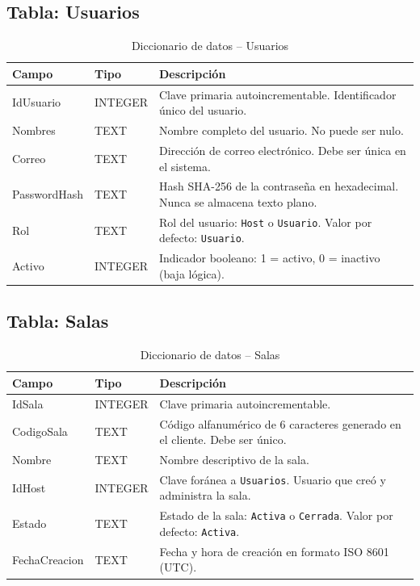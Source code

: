 \documentclass[12pt,a4paper]{article}
\begin{document}
\subsection*{Tabla: Usuarios}
\begin{table}[H]
\centering
\small
\begin{tabular}{p{3cm}p{2cm}p{8.5cm}}
\toprule
\textbf{Campo} & \textbf{Tipo} & \textbf{Descripci\'on} \\
\midrule
IdUsuario & INTEGER & Clave primaria autoincrementable. Identificador \'unico del usuario. \\
Nombres & TEXT & Nombre completo del usuario. No puede ser nulo. \\
Correo & TEXT & Direcci\'on de correo electr\'onico. Debe ser \'unica en el sistema. \\
PasswordHash & TEXT & Hash SHA-256 de la contrase\~na en hexadecimal. Nunca se almacena texto plano. \\
Rol & TEXT & Rol del usuario: \texttt{Host} o \texttt{Usuario}. Valor por defecto: \texttt{Usuario}. \\
Activo & INTEGER & Indicador booleano: 1 = activo, 0 = inactivo (baja l\'ogica). \\
\bottomrule
\end{tabular}
\caption{Diccionario de datos -- Usuarios}
\end{table}

\subsection*{Tabla: Salas}
\begin{table}[H]
\centering
\small
\begin{tabular}{p{3cm}p{2cm}p{8.5cm}}
\toprule
\textbf{Campo} & \textbf{Tipo} & \textbf{Descripci\'on} \\
\midrule
IdSala & INTEGER & Clave primaria autoincrementable. \\
CodigoSala & TEXT & C\'odigo alfanum\'erico de 6 caracteres generado en el cliente. Debe ser \'unico. \\
Nombre & TEXT & Nombre descriptivo de la sala. \\
IdHost & INTEGER & Clave for\'anea a \texttt{Usuarios}. Usuario que cre\'o y administra la sala. \\
Estado & TEXT & Estado de la sala: \texttt{Activa} o \texttt{Cerrada}. Valor por defecto: \texttt{Activa}. \\
FechaCreacion & TEXT & Fecha y hora de creaci\'on en formato ISO 8601 (UTC). \\
\bottomrule
\end{tabular}
\caption{Diccionario de datos -- Salas}
\end{table}
\end{document}

